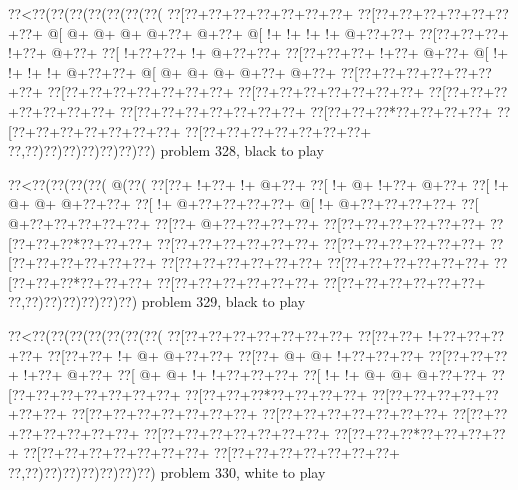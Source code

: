\vbox{\vbox{\goo
\0??<\0??(\0??(\0??(\0??(\0??(\0??(\0??(
\0??[\0??+\0??+\0??+\0??+\0??+\0??+\0??+
\0??[\0??+\0??+\0??+\0??+\0??+\0??+\0??+
\- @[\- @+\- @+\- @+\- @+\0??+\- @+\0??+
\- @[\- !+\- !+\- !+\- !+\- @+\0??+\0??+
\0??[\0??+\0??+\0??+\- !+\0??+\- @+\0??+
\0??[\- !+\0??+\0??+\- !+\- @+\0??+\0??+
\0??[\0??+\0??+\0??+\- !+\0??+\- @+\0??+
\- @[\- !+\- !+\- !+\- !+\- @+\0??+\0??+
\- @[\- @+\- @+\- @+\- @+\0??+\- @+\0??+
\0??[\0??+\0??+\0??+\0??+\0??+\0??+\0??+
\0??[\0??+\0??+\0??+\0??+\0??+\0??+\0??+
\0??[\0??+\0??+\0??+\0??+\0??+\0??+\0??+
\0??[\0??+\0??+\0??+\0??+\0??+\0??+\0??+
\0??[\0??+\0??+\0??+\0??+\0??+\0??+\0??+
\0??[\0??+\0??+\0??*\0??+\0??+\0??+\0??+
\0??[\0??+\0??+\0??+\0??+\0??+\0??+\0??+
\0??[\0??+\0??+\0??+\0??+\0??+\0??+\0??+
\0??,\0??)\0??)\0??)\0??)\0??)\0??)\0??)
}
\hfil problem 328, black to play\hfil\break
}

\vbox{\vbox{\goo
\0??<\0??(\0??(\0??(\0??(\- @(\0??(
\0??[\0??+\- !+\0??+\- !+\- @+\0??+
\0??[\- !+\- @+\- !+\0??+\- @+\0??+
\0??[\- !+\- @+\- @+\- @+\0??+\0??+
\0??[\- !+\- @+\0??+\0??+\0??+\0??+
\- @[\- !+\- @+\0??+\0??+\0??+\0??+
\0??[\- @+\0??+\0??+\0??+\0??+\0??+
\0??[\0??+\- @+\0??+\0??+\0??+\0??+
\0??[\0??+\0??+\0??+\0??+\0??+\0??+
\0??[\0??+\0??+\0??*\0??+\0??+\0??+
\0??[\0??+\0??+\0??+\0??+\0??+\0??+
\0??[\0??+\0??+\0??+\0??+\0??+\0??+
\0??[\0??+\0??+\0??+\0??+\0??+\0??+
\0??[\0??+\0??+\0??+\0??+\0??+\0??+
\0??[\0??+\0??+\0??+\0??+\0??+\0??+
\0??[\0??+\0??+\0??*\0??+\0??+\0??+
\0??[\0??+\0??+\0??+\0??+\0??+\0??+
\0??[\0??+\0??+\0??+\0??+\0??+\0??+
\0??,\0??)\0??)\0??)\0??)\0??)\0??)
}
\hfil problem 329, black to play\hfil\break
}

\vbox{\vbox{\goo
\0??<\0??(\0??(\0??(\0??(\0??(\0??(\0??(
\0??[\0??+\0??+\0??+\0??+\0??+\0??+\0??+
\0??[\0??+\0??+\- !+\0??+\0??+\0??+\0??+
\0??[\0??+\0??+\- !+\- @+\- @+\0??+\0??+
\0??[\0??+\- @+\- @+\- !+\0??+\0??+\0??+
\0??[\0??+\0??+\0??+\- !+\0??+\- @+\0??+
\0??[\- @+\- @+\- !+\- !+\0??+\0??+\0??+
\0??[\- !+\- !+\- @+\- @+\- @+\0??+\0??+
\0??[\0??+\0??+\0??+\0??+\0??+\0??+\0??+
\0??[\0??+\0??+\0??*\0??+\0??+\0??+\0??+
\0??[\0??+\0??+\0??+\0??+\0??+\0??+\0??+
\0??[\0??+\0??+\0??+\0??+\0??+\0??+\0??+
\0??[\0??+\0??+\0??+\0??+\0??+\0??+\0??+
\0??[\0??+\0??+\0??+\0??+\0??+\0??+\0??+
\0??[\0??+\0??+\0??+\0??+\0??+\0??+\0??+
\0??[\0??+\0??+\0??*\0??+\0??+\0??+\0??+
\0??[\0??+\0??+\0??+\0??+\0??+\0??+\0??+
\0??[\0??+\0??+\0??+\0??+\0??+\0??+\0??+
\0??,\0??)\0??)\0??)\0??)\0??)\0??)\0??)
}
\hfil problem 330, white to play\hfil\break
}

